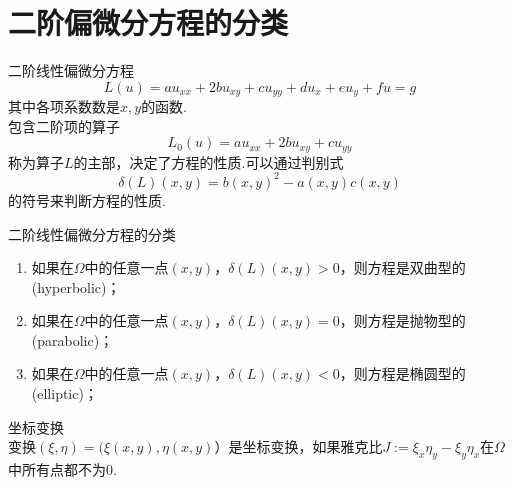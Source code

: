 \section{二阶偏微分方程的分类}
	二阶线性偏微分方程
	\begin{equation} \label{2nd order linear pde}
		L(u) = a u_{xx} + 2bu_{xy} + c u_{yy} + du_x + eu_y +fu = g
	\end{equation}
	其中各项系数数是$x,y$的函数.\\
	包含二阶项的算子
	\begin{equation}
		L_0(u) = a u_{xx} + 2bu_{xy} + c u_{yy}
	\end{equation}
	称为算子$L$的主部，决定了方程的性质.可以通过判别式
	\begin{equation}
		\delta(L)(x,y) = b(x,y)^2 - a(x,y)c(x,y)
	\end{equation}
	的符号来判断方程的性质.
	
	\begin{mydef} 
		二阶线性偏微分方程的分类
		\begin{enumerate}[(1)]
		\item 如果在$\Omega$中的任意一点$(x,y)$，$\delta(L)(x,y)>0$，则方程是双曲型的(hyperbolic)；
		\item 如果在$\Omega$中的任意一点$(x,y)$，$\delta(L)(x,y)=0$，则方程是抛物型的(parabolic)；
		\item 如果在$\Omega$中的任意一点$(x,y)$，$\delta(L)(x,y)<0$，则方程是椭圆型的(elliptic)；
		\end{enumerate}
	\end{mydef}

	\begin{mydef}
		坐标变换\\
		变换$(\xi,\eta)=(\xi(x,y),\eta(x,y)）$是坐标变换，如果雅克比$J:=\xi_x\eta_y - \xi_y\eta_x$在$\Omega$中所有点都不为$0$.
	\end{mydef}

